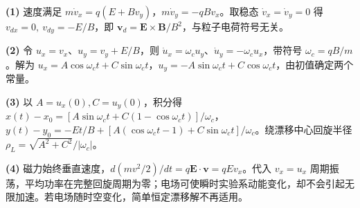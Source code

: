 \par\noindent\textbf{(1)} 速度满足 \(m\dot v_x=q(E+Bv_y)\)，\(m\dot v_y=-qBv_x\)。取稳态 \(\dot v_x=\dot v_y=0\) 得 \(v_{dx}=0,\ v_{dy}=-E/B\)，即 \(\boldsymbol v_d=\boldsymbol E\times\boldsymbol B/B^2\)，与粒子电荷符号无关。
\par\noindent\textbf{(2)} 令 \(u_x=v_x\)、\(u_y=v_y+E/B\)，则 \(\dot u_x=\omega_cu_y\)、\(\dot u_y=-\omega_cu_x\)，带符号 \(\omega_c=qB/m\)。解为 \(u_x=A\cos\omega_ct+C\sin\omega_ct\)，\(u_y=-A\sin\omega_ct+C\cos\omega_ct\)，由初值确定两个常量。
\par\noindent\textbf{(3)} 以 \(A=u_x(0),C=u_y(0)\)，积分得 \(x(t)-x_0=[A\sin\omega_ct+C(1-\cos\omega_ct)]/\omega_c\)，\(y(t)-y_0=-Et/B+[A(\cos\omega_ct-1)+C\sin\omega_ct]/\omega_c\)。绕漂移中心回旋半径 \(\rho_L=\sqrt{A^2+C^2}/|\omega_c|\)。
\par\noindent\textbf{(4)} 磁力始终垂直速度，\(d(mv^2/2)/dt=q\boldsymbol E\cdot\boldsymbol v=qEv_x\)。代入 \(v_x=u_x\) 周期振荡，平均功率在完整回旋周期为零；电场可使瞬时实验系动能变化，却不会引起无限加速。若电场随时空变化，简单恒定漂移解不再适用。
